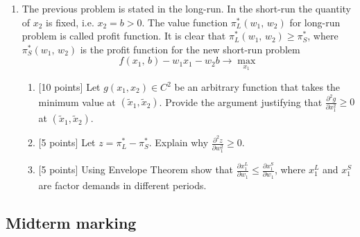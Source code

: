 \begin{enumerate}
\item The previous problem is stated in the long-run. In the short-run the quantity of ${x_2}$ is fixed, i.e. ${x_2} = b > 0$. The value function $\pi _L^*({w_1},\,{w_2})$ for long-run problem is called profit function. It is clear that $\pi_L^*({w_1},\,{w_2}) \geqslant \pi _S^*$, where $\pi_S^*({w_1},\,{w_2})$  is the profit function for the new short-run problem
\[
f({x_1},\,b) - {w_1}{x_1} - {w_2}b \to \max_{x_1}
\]
\begin{enumerate}
  \item {[10 points]} Let $g({x_1}, {x_2}) \in {C^2}$ be an arbitrary function that takes the minimum value at $({\tilde x_1}, {\tilde x_2})$. Provide the argument justifying that $\frac{{{\partial ^2}g}}{{\partial x_1^2}} \geqslant 0$ at $({\tilde x_1}, {\tilde x_2})$.
  \item {[5 points]} Let $z = \pi _L^* - \pi _S^*$. Explain why $\frac{{{\partial ^2}z}}{{\partial w_1^2}} \geqslant 0$.
  \item {[5 points]} Using Envelope Theorem show that $\frac{{\partial x_1^L}}{{\partial {w_1}}} \leqslant \frac{{\partial x_1^S}}{{\partial {w_1}}}$, where $x_1^L$ and $x_1^S$ are factor demands in different periods.
\end{enumerate}

\end{enumerate}

\subsection{Midterm marking}

